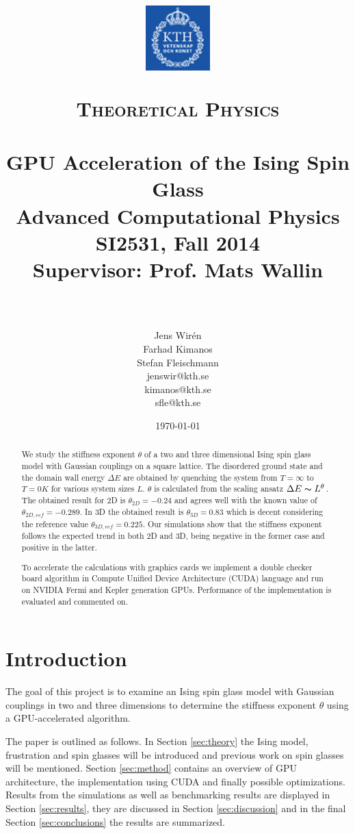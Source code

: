 \documentclass[paper=a4, fontsize=11pt]{scrartcl} %
\title{
\vspace{-2.5cm}
\begin{center}
\includegraphics[width=2.5cm]{logo-kth.png}\\[-1mm]
\hspace{-3mm}
\end{center}
\normalfont \normalsize
\textsc{Theoretical Physics} \\ [25pt] %
\horrule{0.5pt} \\[0.4cm] %
\huge GPU Acceleration of the Ising Spin Glass \\ %
\Large Advanced Computational Physics\\ %
\Large SI2531, Fall 2014\\ %
\Large Supervisor: Prof. Mats Wallin \\ %
\horrule{2pt} \\[0.5cm] %
}
\author{Jens Wir\'{e}n \\
Farhad Kimanos \\
Stefan Fleischmann \\
\normalsize jenswir@kth.se \\
\normalsize kimanos@kth.se \\
\normalsize sfle@kth.se} %
\date{\normalsize\today} %
\numberwithin{equation}{section} %
\numberwithin{figure}{section} %
\numberwithin{table}{section} %
\begin{document}
\maketitle %


\begin{abstract}
We study the stiffness exponent $\theta$ of a two and three dimensional Ising spin glass model with Gaussian couplings on a square lattice. The disordered ground state and the domain wall energy $\Delta E$ are obtained by quenching the system from $T=\infty$ to $T=0 K$ for various system sizes $L$. $\theta$ is calculated from the scaling ansatz $\Delta E \thicksim L^\theta$. The obtained result for 2D is $\theta_{2D}=-0.24$ and agrees well with the known value of $\theta_{2D,ref}=-0.289$. In 3D the obtained result is $\theta_{3D}=0.83$ which is decent considering the reference value $\theta_{3D,ref}=0.225$. Our simulations show that the stiffness exponent follows the expected trend in both 2D and 3D, being negative in the former case and positive in the latter.

To accelerate the calculations with graphics cards we implement a double checker board algorithm in Compute Unified Device Architecture (CUDA) language and run on NVIDIA Fermi and Kepler generation GPUs. Performance of the implementation is evaluated and commented on. 
\end{abstract}

\pagebreak

\tableofcontents

\section{Introduction}

The goal of this project is to examine an Ising spin glass model with Gaussian couplings in two and three dimensions to determine the stiffness exponent $\theta$ using a GPU-accelerated algorithm.

The paper is outlined as follows. In Section \ref{sec:theory} the Ising model, frustration and spin glasses will be introduced and previous work on spin glasses will be mentioned. Section \ref{sec:method} contains an overview of GPU architecture, the implementation using CUDA and finally possible optimizations. Results from the simulations as well as benchmarking results are displayed in Section \ref{sec:results}, they are discussed in Section \ref{sec:discussion} and in the final Section \ref{sec:conclusions} the results are summarized.
\end{document}
